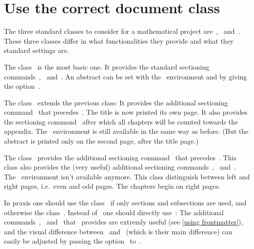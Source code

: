 \section{Use the correct document class}

The three standard classes to consider for a mathematical project are~,~ and~.
These three classes differ in what functionalities they provide and what they standard settings are.

The class~ is the most basic one.
It provides the standard sectioning commands~,~ and~.
An abstract can be set with the~ environment and by giving~ the option~.

The class~ extends the previous class:
It provides the additional sectioning command~ that precedes~.
The title is now printed its own page.
It also provides the sectioning command~ after which all chapters will be counted towards the appendix.
The~ environment is still available in the same way as before.
(But the abstract is printed only on the second page, after the title page.)

The class~ provides the additional sectioning command~ that precedes~.
This class also provides the (very useful) additional sectioning commands~,~ and~.
The~ environment isn’t available anymore.
This class distinguish between left and right pages, i.e.\ even and odd pages.
The chapters begin on right pages.

In praxis one should use the class~ if only sections and subsections are used, and otherwise the class~.
Instead of~ one should directly use~:
The additional commands~,~ and~ that~ provides are extremly useful (see \cref{using frontmatter}), and the visual difference between~ and~ (which is their main difference) can easily be adjusted by passing the option~ to~.





